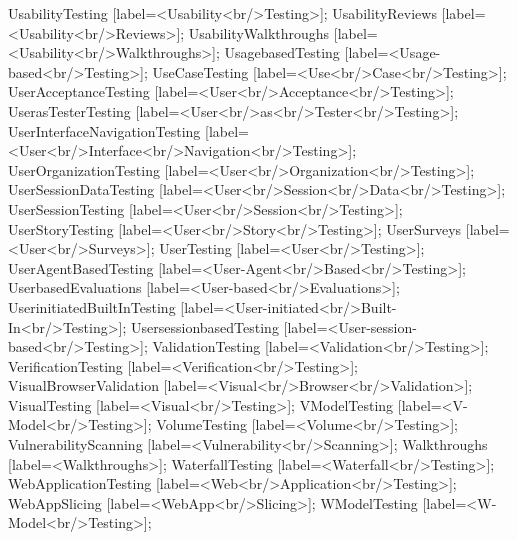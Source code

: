 \documentclass{article}
\begin{document}
{UsabilityTesting [label=<Usability<br/>Testing>];
UsabilityReviews [label=<Usability<br/>Reviews>];
UsabilityWalkthroughs [label=<Usability<br/>Walkthroughs>];
UsagebasedTesting [label=<Usage-based<br/>Testing>];
UseCaseTesting [label=<Use<br/>Case<br/>Testing>];
UserAcceptanceTesting [label=<User<br/>Acceptance<br/>Testing>];
UserasTesterTesting [label=<User<br/>as<br/>Tester<br/>Testing>];
UserInterfaceNavigationTesting [label=<User<br/>Interface<br/>Navigation<br/>Testing>];
UserOrganizationTesting [label=<User<br/>Organization<br/>Testing>];
UserSessionDataTesting [label=<User<br/>Session<br/>Data<br/>Testing>];
UserSessionTesting [label=<User<br/>Session<br/>Testing>];
UserStoryTesting [label=<User<br/>Story<br/>Testing>];
UserSurveys [label=<User<br/>Surveys>];
UserTesting [label=<User<br/>Testing>];
UserAgentBasedTesting [label=<User-Agent<br/>Based<br/>Testing>];
UserbasedEvaluations [label=<User-based<br/>Evaluations>];
UserinitiatedBuiltInTesting [label=<User-initiated<br/>Built-In<br/>Testing>];
UsersessionbasedTesting [label=<User-session-based<br/>Testing>];
ValidationTesting [label=<Validation<br/>Testing>];
VerificationTesting [label=<Verification<br/>Testing>];
VisualBrowserValidation [label=<Visual<br/>Browser<br/>Validation>];
VisualTesting [label=<Visual<br/>Testing>];
VModelTesting [label=<V-Model<br/>Testing>];
VolumeTesting [label=<Volume<br/>Testing>];
VulnerabilityScanning [label=<Vulnerability<br/>Scanning>];
Walkthroughs [label=<Walkthroughs>];
WaterfallTesting [label=<Waterfall<br/>Testing>];
WebApplicationTesting [label=<Web<br/>Application<br/>Testing>];
WebAppSlicing [label=<WebApp<br/>Slicing>];
WModelTesting [label=<W-Model<br/>Testing>];

}
\end{document}
